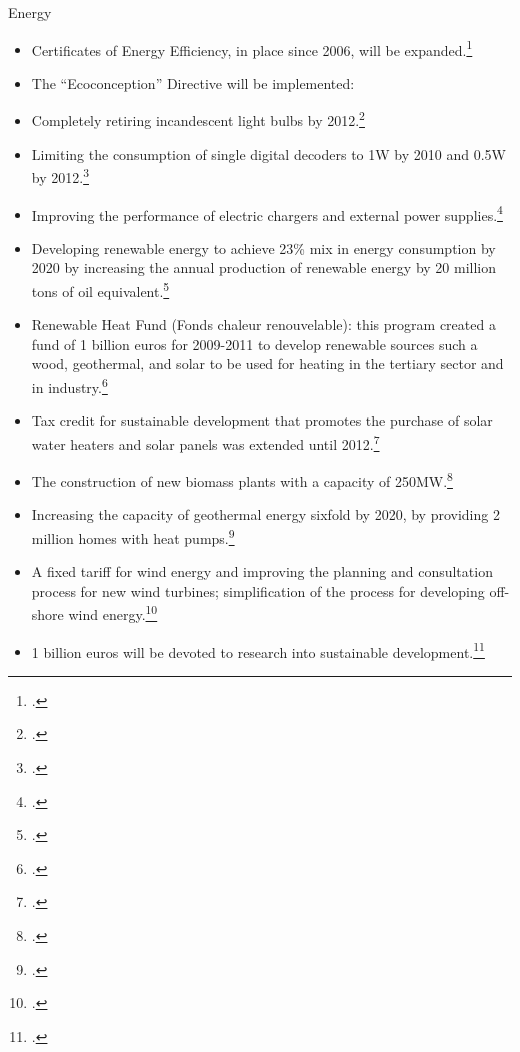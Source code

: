 Energy
\begin{itemize}
	\item Certificates of Energy Efficiency, in place since 2006, will be expanded.\footcite[][]{GrenellePolicies}
	\item The “Ecoconception” Directive will be implemented:
	\item Completely retiring incandescent light bulbs by 2012.\footcite[][]{GrenellePolicies}
	\item Limiting the consumption of single digital decoders to 1W by 2010 and 0.5W by 2012.\footcite[][]{GrenellePolicies}
	\item Improving the performance of electric chargers and external power supplies.\footcite[][]{GrenellePolicies}
	\item Developing renewable energy to achieve 23\% mix in energy consumption by 2020 by increasing the annual production of renewable energy by 20 million tons of oil equivalent.\footcite[][]{GrenellePolicies}
	\item Renewable Heat Fund (Fonds chaleur renouvelable): this program created a fund of 1 billion euros for 2009-2011 to develop renewable sources such a wood, geothermal, and solar to be used for heating in the tertiary sector and in industry.\footcite[][]{GrenellePolicies}
	\item Tax credit for sustainable development that promotes the purchase of solar water heaters and solar panels was extended until 2012.\footcite[][]{GrenellePolicies}
	\item The construction of new biomass plants with a capacity of 250MW.\footcite[][]{GrenellePolicies}
	\item Increasing the capacity of geothermal energy sixfold by 2020, by providing 2 million homes with heat pumps.\footcite[][]{GrenellePolicies}
	\item A fixed tariff for wind energy and improving the planning and consultation process for new wind turbines; simplification of the process for developing off-shore wind energy.\footcite[][]{GrenellePolicies}
	\item 1 billion euros will be devoted to research into sustainable development.\footcite[][]{GrenellePolicies} 
\end{itemize}



